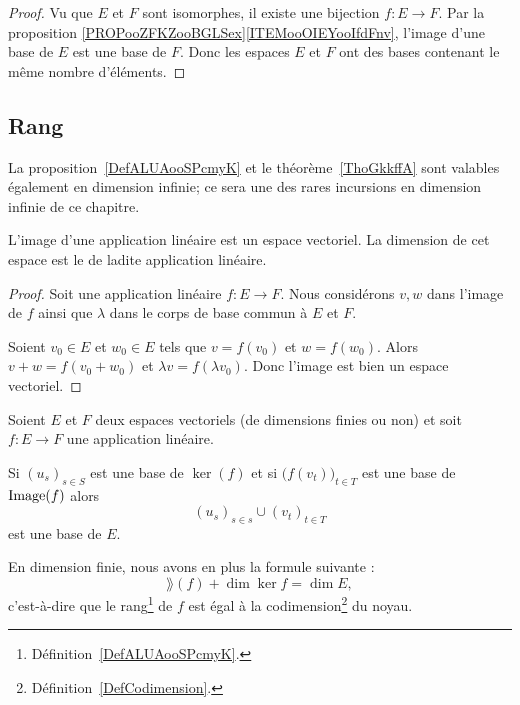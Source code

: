 \begin{proof}
    Vu que \( E\) et \( F\) sont isomorphes, il existe une bijection \( f\colon E\to F\). Par la proposition \ref{PROPooZFKZooBGLSex}\ref{ITEMooOIEYooIfdFnv}, l'image d'une base de \( E\) est une base de \( F\). Donc les espaces \( E\) et \( F\) ont des bases contenant le même nombre d'éléments.
\end{proof}

\subsection{Rang}

La proposition~\ref{DefALUAooSPcmyK} et le théorème~\ref{ThoGkkffA} sont valables également en dimension infinie; ce sera une des rares incursions en dimension infinie de ce chapitre.
\begin{propositionDef}\label{DefALUAooSPcmyK}
    L'image d'une application linéaire est un espace vectoriel. La dimension de cet espace est le  de ladite application linéaire.
\end{propositionDef}

\begin{proof}
    Soit une application linéaire \( f\colon E\to F\). Nous considérons \( v,w\) dans l'image de \( f\) ainsi que \( \lambda\) dans le corps de base commun à \( E\) et \( F\).

    Soient \( v_0\in E\) et \( w_0\in E\) tels que \( v=f(v_0)\) et \( w=f(w_0)\). Alors \( v+w=f(v_0+w_0)\) et \( \lambda v=f(\lambda v_0)\). Donc l'image est bien un espace vectoriel.
\end{proof}

\begin{theorem}       \label{ThoGkkffA}
    Soient \( E\) et \( F\) deux espaces vectoriels (de dimensions finies ou non) et soit \( f\colon E\to F\) une application linéaire. 
    
   Si \( (u_s)_{s\in S}\) est une base de \( \ker(f)\) et si \( \big( f(v_t) \big)_{t\in T}\) est une base de \( \operatorname{Image}(f)\) alors 
   \begin{equation}
   (u_s)_{s\in s}\cup (v_t)_{t\in T}
   \end{equation}
   est une base de \( E\).
    
   En dimension finie, nous avons en plus la formule suivante :
   \begin{equation}     \label{EQooUEOQooLySRiE}
       \rang(f)+\dim\ker f=\dim E,
   \end{equation}
   c'est-à-dire que le rang\footnote{Définition~\ref{DefALUAooSPcmyK}.} de \( f\) est égal à la codimension\footnote{Définition~\ref{DefCodimension}.} du noyau.
\end{theorem}

